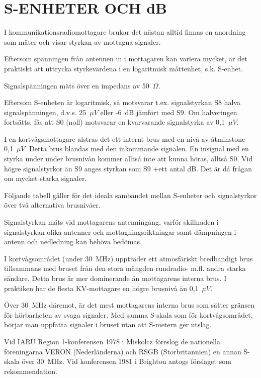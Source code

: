 \chapter{S-ENHETER OCH dB}
\label{s-enhet}

I kommunikationsradiomottagare brukar det nästan alltid finnas en
anordning som mäter och visar styrkan av mottagna signaler.

Eftersom spänningen från antennen in i mottagaren kan variera mycket,
är det praktiskt att uttrycka styrkevärdena i en logaritmisk måttenhet,
s.k. S-enhet.

Signalspänningen mäts över en impedans av 50~\(\Omega\).

Eftersom S-enheten är logaritmisk, så motsvarar t.ex. signalstyrkan
S8 halva signalspänningen, d.v.s. 25~\(\mu V\) eller -6~dB jämfört med S9. Om
halveringen fortsätts, fås att S0 (noll) motsvarar en kvarvarande
signalstyrka av 0,1~\(\mu V\).

I en kortvågsmottagare alstras det ett internt brus med en nivå av
åtminstone 0,1~\(\mu V\).  Detta brus blandas med den inkommande signalen. En
insignal med en styrka under under brusnivån kommer alltså inte att
kunna höras, alltså S0. Vid högre signalstyrkor än S9 anges styrkan
som S9 +ett antal dB. Det är då frågan om mycket starka signaler.

Följande tabell gäller för det ideala sambandet mellan S-enheter och
signalstyrkor över två alternativa brusnivåer.

Signalstyrkan mäts vid mottagarens antenningång, varför skillnaden i
signalstyrkan olika antenner och mottagningsriktningar samt dämpningen
i antenn och nedledning kan behöva bedömas.

I kortvågsområdet (under 30~MHz) uppträder ett atmosfäriskt
bredbandigt brus tillsammans med bruset från den stora mängden
rundradio- m.fl. andra starka sändare. Detta brus är mer dominerande
än mottagarens interna brus. I praktiken har de flesta KV-mottagare en
högre brusnivå än 0,1~\(\mu V\).

Över 30~MHz däremot, är det mest mottagarens interna brus som sätter
gränsen för hörbarheten av svaga signaler. Med samma S-skala som för
kortvågsområdet, börjar man uppfatta signaler i bruset utan att
S-metern ger utslag.

Vid IARU Region 1-konferensen 1978 i Miskolcz föreslog de nationella
föreningarna VERON (Nederländerna) och RSGB (Storbritannien) en annan
S-skala över 30~MHz.  Vid konferensen 1981 i Brighton antogs förslaget
som rekommendation.

